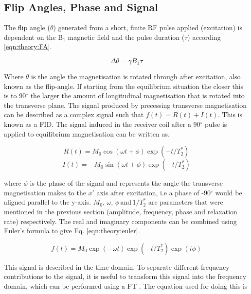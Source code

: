 \subsection{Flip Angles, Phase and Signal}

The flip angle ($\theta$) generated from a short, finite \ac{RF} pulse applied (excitation) is dependent on the B$_1$ magnetic field and the pulse duration ($\tau$) according \ref{eqn:theory:FA}.

\begin{equation}
    \Delta\theta = \gamma B_1 \tau
    \label{eqn:theory:FA}
\end{equation}

Where $\theta$ is the angle the magnetisation is rotated through after excitation, also known as the flip-angle. If starting from the equilibrium situation the closer this is to 90$^\circ$ the larger the amount of longitudinal magnetisation that is rotated into the transverse plane. The signal produced by precessing transverse magnetisation can be described as a complex signal such that $f(t) = R(t) + I(t)$. This is known as a \ac{FID}. The signal induced in the receiver coil after a 90$^\circ$ pulse is applied to equilibrium magnetisation can be written as.

\begin{equation}
    R(t) = M_0\cos(\omega t+ \phi)\exp(-t/T_2^*)
    \label{eqn:theory:real}
\end{equation}
\begin{equation}
    I(t) = -M_0\sin(\omega t+ \phi)\exp(-t/T_2^*)
    \label{eqn:theory:imag}
\end{equation}

\noindent where $\phi$ is the phase of the signal and represents the angle the transverse magnetisation makes to the $x'$ axis after excitation, i.e a phase of -90$^\circ$ would be aligned parallel to the y-axis. $M_0, \, \omega, \, \phi \, \textrm{and} \, 1/T_2^*$ are parameters that were mentioned in the previous section (amplitude, frequency, phase and relaxation rate) respectively. The real and imaginary components can be combined using Euler's formula to give Eq. \ref{eqn:theory:euler}. 

\begin{equation}
    f(t) = M_0\exp(-\omega t)\exp(-t/T_2^*)\exp(i\phi)
    \label{eqn:theory:euler}
\end{equation}

This signal is described in the time-domain. To separate different frequency contributions to the signal, it is useful to transform this signal into the frequency domain, which can be performed using a \ac{FT} \cite{Fourier1822TheorieChaleur}. The equation used for doing this is

